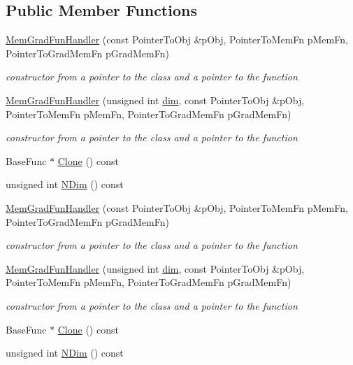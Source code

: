 \subsection*{Public Member Functions}
\begin{DoxyCompactItemize}
\item 
\mbox{\hyperlink{classROOT_1_1Math_1_1MemGradFunHandler_afb840379796fb7d05d885bc3152a3175}{Mem\+Grad\+Fun\+Handler}} (const Pointer\+To\+Obj \&p\+Obj, Pointer\+To\+Mem\+Fn p\+Mem\+Fn, Pointer\+To\+Grad\+Mem\+Fn p\+Grad\+Mem\+Fn)
\begin{DoxyCompactList}\small\item\em constructor from a pointer to the class and a pointer to the function \end{DoxyCompactList}\item 
\mbox{\hyperlink{classROOT_1_1Math_1_1MemGradFunHandler_a1e421d0a42589a826fd0b9f7f1a475ec}{Mem\+Grad\+Fun\+Handler}} (unsigned int \mbox{\hyperlink{irrep__util_8cc_a70b5e28b5bc3d1b63a7435c5fe50b837}{dim}}, const Pointer\+To\+Obj \&p\+Obj, Pointer\+To\+Mem\+Fn p\+Mem\+Fn, Pointer\+To\+Grad\+Mem\+Fn p\+Grad\+Mem\+Fn)
\begin{DoxyCompactList}\small\item\em constructor from a pointer to the class and a pointer to the function \end{DoxyCompactList}\item 
Base\+Func $\ast$ \mbox{\hyperlink{classROOT_1_1Math_1_1MemGradFunHandler_a987e3b1a8492990c3c2a5c3eca9964a6}{Clone}} () const
\item 
unsigned int \mbox{\hyperlink{classROOT_1_1Math_1_1MemGradFunHandler_acdd729dc718e1ecf3bac32af990904b4}{N\+Dim}} () const
\item 
\mbox{\hyperlink{classROOT_1_1Math_1_1MemGradFunHandler_afb840379796fb7d05d885bc3152a3175}{Mem\+Grad\+Fun\+Handler}} (const Pointer\+To\+Obj \&p\+Obj, Pointer\+To\+Mem\+Fn p\+Mem\+Fn, Pointer\+To\+Grad\+Mem\+Fn p\+Grad\+Mem\+Fn)
\begin{DoxyCompactList}\small\item\em constructor from a pointer to the class and a pointer to the function \end{DoxyCompactList}\item 
\mbox{\hyperlink{classROOT_1_1Math_1_1MemGradFunHandler_a1e421d0a42589a826fd0b9f7f1a475ec}{Mem\+Grad\+Fun\+Handler}} (unsigned int \mbox{\hyperlink{irrep__util_8cc_a70b5e28b5bc3d1b63a7435c5fe50b837}{dim}}, const Pointer\+To\+Obj \&p\+Obj, Pointer\+To\+Mem\+Fn p\+Mem\+Fn, Pointer\+To\+Grad\+Mem\+Fn p\+Grad\+Mem\+Fn)
\begin{DoxyCompactList}\small\item\em constructor from a pointer to the class and a pointer to the function \end{DoxyCompactList}\item 
Base\+Func $\ast$ \mbox{\hyperlink{classROOT_1_1Math_1_1MemGradFunHandler_a987e3b1a8492990c3c2a5c3eca9964a6}{Clone}} () const
\item 
unsigned int \mbox{\hyperlink{classROOT_1_1Math_1_1MemGradFunHandler_acdd729dc718e1ecf3bac32af990904b4}{N\+Dim}} () const
\end{DoxyCompactItemize}


